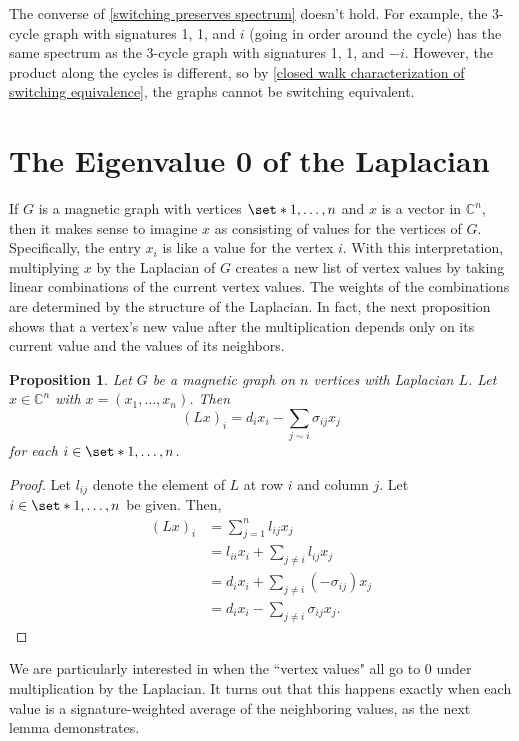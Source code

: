 \documentclass[12pt]{article}
\newtheorem{prop}[thm]{Proposition}
\theoremstyle{definition}
\newcommand{\C}{\mathbb C}
\begin{document}
The converse of \cref{switching preserves spectrum} doesn't hold. For example, the 3-cycle graph with signatures 1, 1, and $i$ (going in order around the cycle) has the same spectrum as the 3-cycle graph with signatures 1, 1, and $-i$. However, the product along the cycles is different, so by \cref{closed walk characterization of switching equivalence}, the graphs cannot be switching equivalent. 

\section{The Eigenvalue 0 of the Laplacian}

If $G$ is a magnetic graph with vertices $\set*{1, \dots, n}$ and $x$ is a vector in $\C^n$, then it makes sense to imagine $x$ as consisting of values for the vertices of $G$. Specifically, the entry $x_i$ is like a value for the vertex $i$. With this interpretation, multiplying $x$ by the Laplacian of $G$ creates a new list of vertex values by taking linear combinations of the current vertex values. The weights of the combinations are determined by the structure of the Laplacian. In fact, the next proposition shows that a vertex's new value after the multiplication depends only on its current value and the values of its neighbors.   


\begin{prop}\label{Laplacian times vector}
Let $G$ be a magnetic graph on $n$ vertices with Laplacian $L$. Let $x \in \C^n$ with $x = (x_1, \dots, x_n)$. Then
$$(Lx)_i = d_ix_i - \sum_{j \sim i} \sigma_{ij} x_j$$
for each $i \in \set*{1, \dots, n}$.
\end{prop}
\begin{proof}
Let $l_{ij}$ denote the element of $L$ at row $i$ and column $j$. Let $i \in \set*{1, \dots, n}$ be given. Then,
\begin{align*}
(Lx)_i &= \sum_{j=1}^n l_{ij}x_j \\
&= l_{ii}x_i + \sum_{j \neq i} l_{ij}x_j \\
&= d_i x_i + \sum_{j \neq i} (-\sigma_{ij})x_j \\
&= d_i x_i - \sum_{j \neq i} \sigma_{ij}x_j.
\end{align*}
\end{proof}

We are particularly interested in when the ``vertex values" all go to 0 under multiplication by the Laplacian. It turns out that this happens exactly when each value is a signature-weighted average of the neighboring values, as the next lemma demonstrates.
\end{document}
